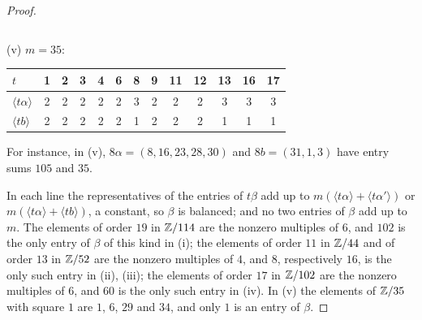 \begin{proof}
\begin{center}
\begin{tabular}{l*{16}{c}}
\bottomrule
\end{tabular}
\end{center}
(v) $m=35$:
\begin{center}
\small
\begin{tabular}{l*{12}{c}}
\toprule
$t$ & 1 & 2 & 3 & 4 & 6 & 8 & 9 & 11 & 12 & 13 & 16 & 17\\
\midrule
$\langle t\alpha\rangle$ & 2&2&2&2&2&3&2&2&2&3&3&3\\
$\langle tb\rangle$ & 2&2&2&2&2&1&2&2&2&1&1&1\\
\bottomrule
\end{tabular}
\end{center}
For instance, in (v), $8\alpha=(8,16,23,28,30)$ and $8b=(31,1,3)$ have
entry sums $105$ and $35$.

In each line the representatives of the entries of $t\beta$ add up to
$m(\langle t\alpha\rangle+\langle t\alpha'\rangle)$ or $m(\langle t\alpha
\rangle+\langle tb\rangle)$, a constant, so $\beta$ is balanced; and no two
entries of $\beta$ add up to $m$. The elements of order $19$ in $\mathbb{Z}/114$ are
the nonzero multiples of $6$, and $102$ is the only entry of $\beta$ of this
kind in (i); the elements of order $11$ in $\mathbb{Z}/44$ and of order $13$ in
$\mathbb{Z}/52$ are the nonzero multiples of $4$, and $8$, respectively $16$, is
the only such entry in (ii), (iii); the elements of order $17$ in $\mathbb{Z}/102$
are the nonzero multiples of $6$, and $60$ is the only such entry in (iv).
In (v) the elements of $\mathbb{Z}/35$ with square $1$ are $1$, $6$, $29$ and
$34$, and only $1$ is an entry of $\beta$.
\end{proof}

